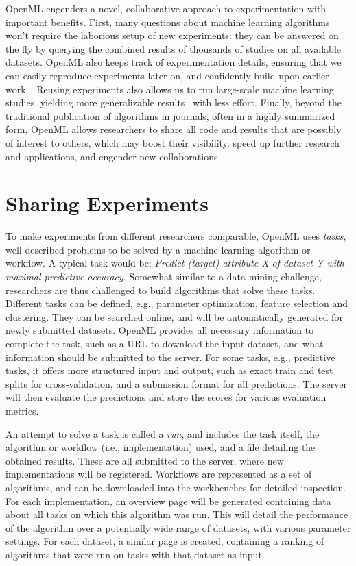 \documentclass{llncs}
\begin{document}
OpenML engenders a novel, collaborative approach to experimentation with important benefits. First, many questions about machine learning algorithms won't require the laborious setup of new experiments: they can be answered on the fly by querying the combined results of thousands of studies on all available datasets. OpenML also keeps track of experimentation details, ensuring that we can easily reproduce experiments later on, and confidently build upon earlier work~\cite{Hirsh2008}. Reusing experiments also allows us to run large-scale machine learning studies, yielding more generalizable results~\cite{Hand2006} with less effort. Finally, beyond the traditional publication of algorithms in journals, often in a highly summarized form, OpenML allows researchers to share all code and results that are possibly of interest to others, which may boost their visibility, speed up further research and applications, and engender new collaborations.

\section{Sharing Experiments}

To make experiments from different researchers comparable, OpenML uses \emph{tasks}, well-described problems to be solved by a machine learning algorithm or workflow. A typical task would be: \emph{Predict (target) attribute X of dataset Y with maximal predictive accuracy}. Somewhat similar to a data mining challenge, researchers are thus challenged to build algorithms that solve these tasks.
Different tasks can be defined, e.g., parameter optimization, feature selection and clustering. They can be searched online, and will be automatically generated for newly submitted datasets.
OpenML provides all necessary information to complete the task, such as a URL to download the input dataset, and what information should be submitted to the server. For some tasks, e.g., predictive tasks, it offers more structured input and output, such as exact train and test splits for cross-validation, and a submission format for all predictions. The server will then evaluate the predictions and store the scores for various evaluation metrics.

An attempt to solve a task is called a \emph{run}, and includes the task itself, the algorithm or workflow (i.e., implementation) used, and a file detailing the obtained results. These are all submitted to the server, where new implementations will be registered. Workflows are represented as a set of algorithms, and can be downloaded into the workbenches for detailed inspection. For each implementation, an overview page will be generated containing data about all tasks on which this algorithm was run. This will detail the performance of the algorithm over a potentially wide range of datasets, with various parameter settings. For each dataset, a similar page is created, containing a ranking of algorithms that were run on tasks with that dataset as input.
\end{document}
